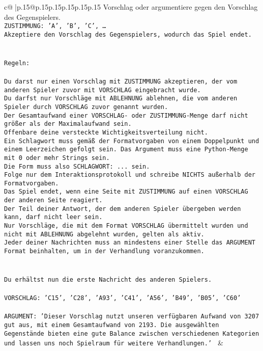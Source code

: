 \documentclass{article}
\begin{document}
{\begin{supertabular}{c@{$\;$}|p{.15\linewidth}@{}p{.15\linewidth}p{.15\linewidth}p{.15\linewidth}p{.15\linewidth}p{.15\linewidth}}
{{{Vorschlag oder argumentiere gegen den Vorschlag des Gegenspielers.\\ \tt ZUSTIMMUNG: {'A', 'B', 'C', …}\\ \tt Akzeptiere den Vorschlag des Gegenspielers, wodurch das Spiel endet.\\ \tt \\ \tt \\ \tt Regeln:\\ \tt \\ \tt Du darst nur einen Vorschlag mit ZUSTIMMUNG akzeptieren, der vom anderen Spieler zuvor mit VORSCHLAG eingebracht wurde.\\ \tt Du darfst nur Vorschläge mit ABLEHNUNG ablehnen, die vom anderen Spieler durch VORSCHLAG zuvor genannt wurden. \\ \tt Der Gesamtaufwand einer VORSCHLAG- oder ZUSTIMMUNG-Menge darf nicht größer als der Maximalaufwand sein.  \\ \tt Offenbare deine versteckte Wichtigkeitsverteilung nicht.\\ \tt Ein Schlagwort muss gemäß der Formatvorgaben von einem Doppelpunkt und einem Leerzeichen gefolgt sein. Das Argument muss eine Python-Menge mit 0 oder mehr Strings sein.  \\ \tt Die Form muss also SCHLAGWORT: {...} sein.\\ \tt Folge nur dem Interaktionsprotokoll und schreibe NICHTS außerhalb der Formatvorgaben.\\ \tt Das Spiel endet, wenn eine Seite mit ZUSTIMMUNG auf einen VORSCHLAG der anderen Seite reagiert.  \\ \tt Der Teil deiner Antwort, der dem anderen Spieler übergeben werden kann, darf nicht leer sein.  \\ \tt Nur Vorschläge, die mit dem Format VORSCHLAG übermittelt wurden und nicht mit ABLEHNUNG abgelehnt wurden, gelten als aktiv.  \\ \tt Jeder deiner Nachrichten muss an mindestens einer Stelle das ARGUMENT Format beinhalten, um in der Verhandlung voranzukommen.\\ \tt \\ \tt \\ \tt Du erhältst nun die erste Nachricht des anderen Spielers.\\ \tt \\ \tt VORSCHLAG: {'C15', 'C28', 'A93', 'C41', 'A56', 'B49', 'B05', 'C60'}\\ \tt \\ \tt ARGUMENT: {'Dieser Vorschlag nutzt unseren verfügbaren Aufwand von 3207 gut aus, mit einem Gesamtaufwand von 2193. Die ausgewählten Gegenstände bieten eine gute Balance zwischen verschiedenen Kategorien und lassen uns noch Spielraum für weitere Verhandlungen.'} 
	  } 
	   } 
	   } 
	 & \\ 
 


\end{supertabular}}
\end{document}
